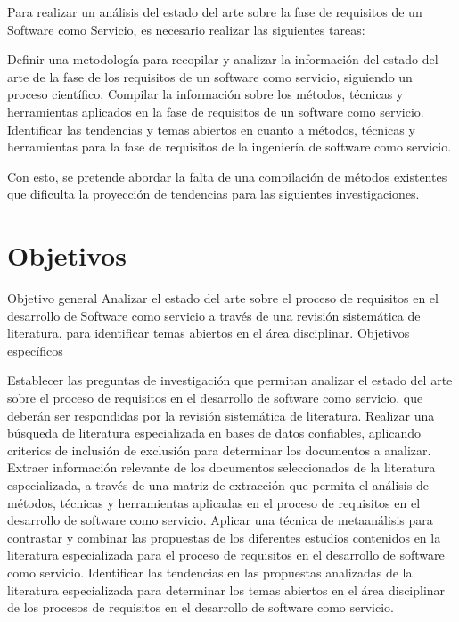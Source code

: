 \documentclass{article}
\begin{document}
Para realizar un análisis del estado del arte sobre la fase de requisitos de un Software como Servicio, es necesario realizar las siguientes tareas:

Definir una metodología para recopilar y analizar la información del estado del arte de la fase de los requisitos de un software como servicio, siguiendo un proceso científico.
Compilar la información sobre los métodos, técnicas y herramientas aplicados en la fase de requisitos de un software como servicio.
Identificar las tendencias y temas abiertos en cuanto a métodos, técnicas y herramientas para la fase de requisitos de la ingeniería de software como servicio.

Con esto, se pretende abordar la falta de una compilación de métodos existentes que dificulta la proyección de tendencias para las siguientes investigaciones. 

\newpage

\section{Objetivos}
Objetivo general
Analizar el estado del arte sobre el proceso de requisitos en el desarrollo de Software como servicio a través de una revisión sistemática de literatura, para identificar temas abiertos en el área disciplinar.
Objetivos específicos

Establecer las preguntas de investigación que permitan analizar el estado del arte sobre el proceso de requisitos en el desarrollo de software como servicio, que deberán ser respondidas por la revisión sistemática de literatura.
Realizar una búsqueda de literatura especializada en bases de datos confiables, aplicando criterios de inclusión de exclusión para determinar los documentos a analizar.
Extraer información relevante de los documentos seleccionados de la literatura especializada, a través de una matriz de extracción que permita el análisis de métodos, técnicas y herramientas aplicadas en el proceso de requisitos en el desarrollo de software como servicio.
Aplicar una técnica de metaanálisis para contrastar y combinar las propuestas de los diferentes estudios contenidos en la literatura especializada para el proceso de requisitos en el desarrollo de software como servicio.
Identificar las tendencias en las propuestas analizadas de la literatura especializada para determinar los temas abiertos en el área disciplinar de los procesos de requisitos en el desarrollo de software como servicio.

\newpage
\end{document}
